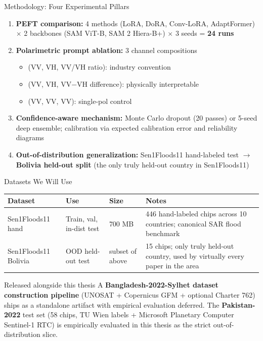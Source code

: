 \documentclass[10pt,aspectratio=169]{beamer}
\begin{document}
\begin{frame}{Methodology: Four Experimental Pillars}
\setlength{\leftmargini}{1.8cm}
\begin{enumerate}
\item[\textbf{Pillar 1}] \textbf{PEFT comparison:} 4 methods (LoRA, DoRA, Conv-LoRA, AdaptFormer) $\times$ 2 backbones (SAM ViT-B, SAM 2 Hiera-B+) $\times$ 3 seeds = \textbf{24 runs}

\vspace{0.3em}
\item[\textbf{Pillar 2}] \textbf{Polarimetric prompt ablation:} 3 channel compositions
\begin{itemize}
\item[\scriptsize$\circ$] (VV, VH, VV/VH ratio): industry convention
\item[\scriptsize$\circ$] (VV, VH, VV$-$VH difference): physically interpretable
\item[\scriptsize$\circ$] (VV, VV, VV): single-pol control
\end{itemize}

\vspace{0.3em}
\item[\textbf{Pillar 3}] \textbf{Confidence-aware mechanism:} Monte Carlo dropout (20 passes) or 5-seed deep ensemble; calibration via expected calibration error and reliability diagrams

\vspace{0.3em}
\item[\textbf{Pillar 4}] \textbf{Out-of-distribution generalization:} Sen1Floods11 hand-labeled test $\rightarrow$ \textbf{Bolivia held-out split} (the only truly held-out country in Sen1Floods11)
\end{enumerate}
\end{frame}

\begin{frame}{Datasets We Will Use}
\renewcommand{\arraystretch}{1.3}
\footnotesize
\begin{tabularx}{\textwidth}{p{3.0cm} p{2.3cm} p{1.3cm} X}
\toprule
\textbf{Dataset} & \textbf{Use} & \textbf{Size} & \textbf{Notes} \\
\midrule
Sen1Floods11 hand & Train, val, in-dist test & 700 MB & 446 hand-labeled chips across 10 countries; canonical SAR flood benchmark \\
Sen1Floods11 Bolivia & OOD held-out test & subset of above & 15 chips; only truly held-out country, used by virtually every paper in the area \\
\bottomrule
\end{tabularx}

\vspace{1em}
\begin{alertblock}{Released alongside this thesis}
A \textbf{Bangladesh-2022-Sylhet dataset construction pipeline} (UNOSAT + Copernicus GFM + optional Charter 762) ships as a standalone artifact with empirical evaluation deferred. The \textbf{Pakistan-2022} test set (58 chips, TU Wien labels + Microsoft Planetary Computer Sentinel-1 RTC) is empirically evaluated in this thesis as the strict out-of-distribution slice.
\end{alertblock}
\end{frame}
\end{document}
